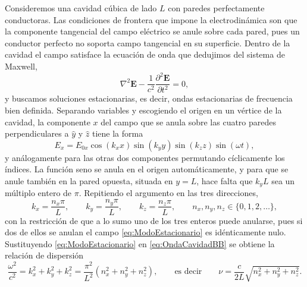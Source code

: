             Consideremos una cavidad cúbica de lado $L$ con paredes perfectamente conductoras. Las condiciones de frontera que impone la electrodinámica son que la componente tangencial del campo eléctrico se anule sobre cada pared, pues un conductor perfecto no soporta campo tangencial en su superficie. Dentro de la cavidad el campo satisface la ecuación de onda que dedujimos del sistema de Maxwell,
            \begin{equation}\label{eq:OndaCavidadBB}
                \nabla^{2}\mathbf{E} - \frac{1}{c^{2}}\frac{\partial^{2}\mathbf{E}}{\partial t^{2}} = 0 ,
            \end{equation}
            y buscamos soluciones estacionarias, es decir, ondas estacionarias de frecuencia bien definida. Separando variables y escogiendo el origen en un vértice de la cavidad, la componente $x$ del campo que se anula sobre las cuatro paredes perpendiculares a $\hat{y}$ y $\hat{z}$ tiene la forma
            \begin{equation}\label{eq:ModoEstacionario}
                E_{x} = E_{0x}\cos\left(k_{x}x\right)\sin\left(k_{y}y\right)\sin\left(k_{z}z\right)\sin\left(\omega t\right),
            \end{equation}
            y análogamente para las otras dos componentes permutando cíclicamente los índices. La función seno se anula en el origen automáticamente, y para que se anule también en la pared opuesta, situada en $y = L$, hace falta que $k_{y}L$ sea un múltiplo entero de $\pi$. Repitiendo el argumento en las tres direcciones,
            \begin{equation}\label{eq:CuantizacionK}
                k_{x} = \frac{n_{x}\pi}{L}, \qquad k_{y} = \frac{n_{y}\pi}{L}, \qquad k_{z} = \frac{n_{z}\pi}{L},
                \qquad n_{x},n_{y},n_{z} \in \{0,1,2,\ldots\},
            \end{equation}
            con la restricción de que a lo sumo uno de los tres enteros puede anularse, pues si dos de ellos se anulan el campo \eqref{eq:ModoEstacionario} es idénticamente nulo. Sustituyendo \eqref{eq:ModoEstacionario} en \eqref{eq:OndaCavidadBB} se obtiene la relación de dispersión
            \begin{equation}\label{eq:DispersionBB}
                \frac{\omega^{2}}{c^{2}} = k_{x}^{2}+k_{y}^{2}+k_{z}^{2} = \frac{\pi^{2}}{L^{2}}\left(n_{x}^{2}+n_{y}^{2}+n_{z}^{2}\right),
                \qquad\text{es decir}\qquad
                \nu = \frac{c}{2L}\sqrt{n_{x}^{2}+n_{y}^{2}+n_{z}^{2}} .
            \end{equation}

